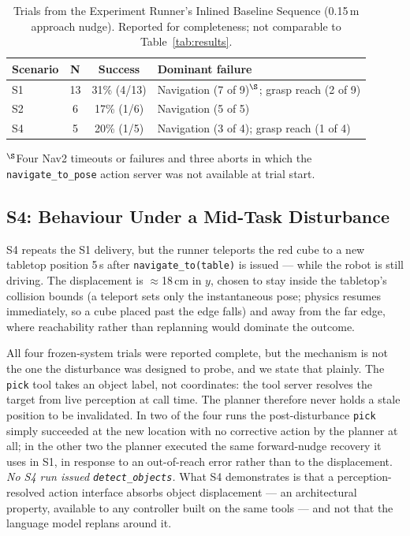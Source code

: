 
\begin{table}[t]
\caption{Trials from the Experiment Runner's Inlined Baseline Sequence
(0.15\,m approach nudge). Reported for completeness; not comparable to
Table~\ref{tab:results}.}
\label{tab:runner-baseline}
\centering
\begin{tabular}{@{}lccl@{}}
\toprule
\textbf{Scenario} & \textbf{N} & \textbf{Success} & \textbf{Dominant failure} \\ \midrule
S1 & 13 & 31\% (4/13) & Navigation (7 of 9)$^{\S}$; grasp reach (2 of 9) \\
S2 & 6  & 17\% (1/6)  & Navigation (5 of 5) \\
S4 & 5  & 20\% (1/5)  & Navigation (3 of 4); grasp reach (1 of 4) \\ \bottomrule
\end{tabular}
\vspace{2pt}
\begin{flushleft}\footnotesize
$^{\S}$Four Nav2 timeouts or failures and three aborts in which the
\texttt{navigate\_to\_pose} action server was not available at trial start.
\end{flushleft}
\end{table}



\subsection{S4: Behaviour Under a Mid-Task Disturbance}
\label{sec:s4}

S4 repeats the S1 delivery, but the runner teleports the red cube to a new
tabletop position 5\,s after \texttt{navigate\_to(table)} is issued --- while
the robot is still driving. The displacement is $\approx$18\,cm in $y$,
chosen to stay inside the tabletop's collision bounds (a teleport sets only
the instantaneous pose; physics resumes immediately, so a cube placed past
the edge falls) and away from the far edge, where reachability rather than
replanning would dominate the outcome.

All four frozen-system trials were reported complete, but the mechanism is
not the one the disturbance was designed to probe, and we state that
plainly. The \texttt{pick} tool takes an object label, not coordinates: the
tool server resolves the target from live perception at call time. The
planner therefore never holds a stale position to be invalidated. In two of
the four runs the post-disturbance \texttt{pick} simply succeeded at the new
location with no corrective action by the planner at all; in the other two
the planner executed the same forward-nudge recovery it uses in S1, in
response to an out-of-reach error rather than to the displacement.
\emph{No S4 run issued \texttt{detect\_objects}.} What S4 demonstrates is
that a perception-resolved action interface absorbs object displacement ---
an architectural property, available to any controller built on the same
tools --- and not that the language model replans around it.

